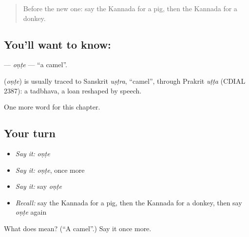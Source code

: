 \label{lesson:KA-C133-onte}



\begin{quote}
Before the new one: say the Kannada for a pig, then the Kannada for a donkey.
\end{quote}

\subsection*{You'll want to know: }
\textbf{} — \emph{oṇṭe} — \textquotedblleft{}a camel\textquotedblright{}.

\begin{cousinweb}
\textbf{} (\emph{oṇṭe}) is usually traced to Sanskrit \emph{uṣṭra}, \textquotedblleft{}camel\textquotedblright{}, through Prakrit \emph{uṭṭa} (CDIAL 2387): a tadbhava, a loan reshaped by speech.
\end{cousinweb}

\begin{grammarlens}[title={What you've built}]
One more word for this chapter.
\end{grammarlens}

\subsection*{Your turn}
\begin{itemize}
\raggedright
  \item \emph{Say it:} \emph{oṇṭe}
  \item \emph{Say it:} \emph{oṇṭe}, once more
  \item \emph{Say it:} say \emph{oṇṭe}
  \item \emph{Recall:} say the Kannada for a pig, then the Kannada for a donkey, then say \emph{oṇṭe} again
\end{itemize}

\begin{tcolorbox}[breakable,colback=teal!4,colframe=teal!35!black,title={Before you move on}]
What does  mean? (\textquotedblleft{}A camel\textquotedblright{}.) Say it once more.
\end{tcolorbox}
